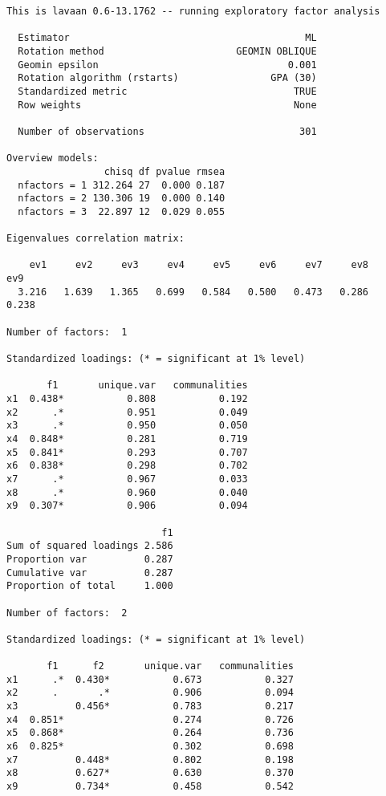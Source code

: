 \begin{verbatim}
This is lavaan 0.6-13.1762 -- running exploratory factor analysis

  Estimator                                         ML
  Rotation method                       GEOMIN OBLIQUE
  Geomin epsilon                                 0.001
  Rotation algorithm (rstarts)                GPA (30)
  Standardized metric                             TRUE
  Row weights                                     None

  Number of observations                           301

Overview models:
                 chisq df pvalue rmsea
  nfactors = 1 312.264 27  0.000 0.187
  nfactors = 2 130.306 19  0.000 0.140
  nfactors = 3  22.897 12  0.029 0.055

Eigenvalues correlation matrix:

    ev1     ev2     ev3     ev4     ev5     ev6     ev7     ev8     ev9 
  3.216   1.639   1.365   0.699   0.584   0.500   0.473   0.286   0.238 

Number of factors:  1 

Standardized loadings: (* = significant at 1% level)

       f1       unique.var   communalities
x1  0.438*           0.808           0.192
x2      .*           0.951           0.049
x3      .*           0.950           0.050
x4  0.848*           0.281           0.719
x5  0.841*           0.293           0.707
x6  0.838*           0.298           0.702
x7      .*           0.967           0.033
x8      .*           0.960           0.040
x9  0.307*           0.906           0.094

                           f1
Sum of squared loadings 2.586
Proportion var          0.287
Cumulative var          0.287
Proportion of total     1.000

Number of factors:  2 

Standardized loadings: (* = significant at 1% level)

       f1      f2       unique.var   communalities
x1      .*  0.430*           0.673           0.327
x2      .       .*           0.906           0.094
x3          0.456*           0.783           0.217
x4  0.851*                   0.274           0.726
x5  0.868*                   0.264           0.736
x6  0.825*                   0.302           0.698
x7          0.448*           0.802           0.198
x8          0.627*           0.630           0.370
x9          0.734*           0.458           0.542


\end{verbatim}
